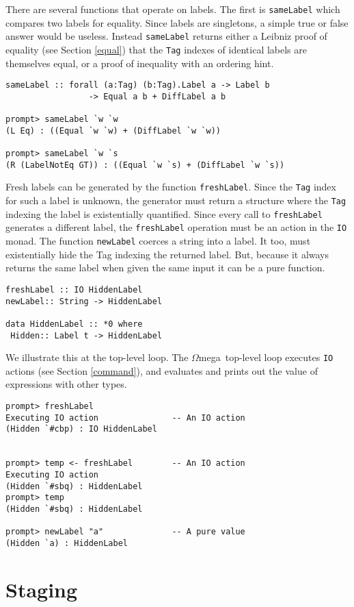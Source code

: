 \documentclass[11pt,twoside]{article}
\newcommand{\om}{$\Omega$mega}
\begin{document}
There are several functions that operate on labels. The first is
{\tt sameLabel} which compares two labels for equality. Since labels
are singletons, a simple true or false answer would be useless.
Instead {\tt sameLabel} returns either a Leibniz proof of equality 
(see Section \ref{equal}) that the {\tt Tag}
indexes of identical labels are themselves equal, or a proof of
inequality with an ordering hint.
\begin{verbatim}
sameLabel :: forall (a:Tag) (b:Tag).Label a -> Label b
                 -> Equal a b + DiffLabel a b

prompt> sameLabel `w `w
(L Eq) : ((Equal `w `w) + (DiffLabel `w `w))

prompt> sameLabel `w `s
(R (LabelNotEq GT)) : ((Equal `w `s) + (DiffLabel `w `s))
\end{verbatim}

Fresh labels can be generated by the function {\tt freshLabel}.
Since the {\tt Tag} index for such a label is unknown, the generator
must return a structure where the
{\tt Tag} indexing the label is existentially quantified. Since every call
to {\tt freshLabel} generates a different label, the {\tt freshLabel}
operation must be an action in the {\tt IO} monad. The function
{\tt newLabel} coerces a string into a label. It too, must
existentially hide the Tag indexing the returned label. But,
because it always returns the same label when given the same input
it can be a pure function.

\begin{verbatim}
freshLabel :: IO HiddenLabel
newLabel:: String -> HiddenLabel

data HiddenLabel :: *0 where 
 Hidden:: Label t -> HiddenLabel
\end{verbatim}
We illustrate this at the top-level loop. The \om\ top-level loop executes
{\tt IO} actions (see Section \ref{command}), and evaluates and prints
out the value of expressions with other types.
\begin{verbatim}
prompt> freshLabel
Executing IO action               -- An IO action
(Hidden `#cbp) : IO HiddenLabel


prompt> temp <- freshLabel        -- An IO action
Executing IO action
(Hidden `#sbq) : HiddenLabel
prompt> temp
(Hidden `#sbq) : HiddenLabel

prompt> newLabel "a"              -- A pure value
(Hidden `a) : HiddenLabel
\end{verbatim}

\section{Staging}
\end{document}
